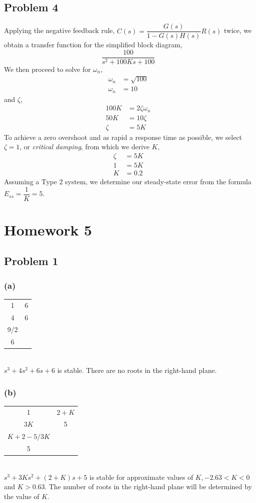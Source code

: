 \documentclass[letterpaper,10pt]{article}
\begin{document}
\subsection*{Problem 4}
Applying the negative feedback rule, $C(s) = \dfrac{G(s)}{1-G(s)H(s)}R(s)$ twice, we obtain a transfer function for the simplified block diagram, \[ \dfrac{100}{s^2 + 100Ks + 100}\]  We then proceed to solve for $\omega_{n}$,
\begin{align*}
	\omega_{n} &= \sqrt{100} \\
	\omega_{n} &= 10 
\end{align*}
and $\zeta$,
\begin{align*}
	100K &= 2\zeta\omega_{n} \\
	50K &= 10\zeta \\
	\zeta &= 5K
\end{align*}
To achieve a zero overshoot and as rapid a response time as possible, we select $\zeta = 1$, or \emph{critical damping}, from which we derive $K$,
\begin{align*}
	\zeta &= 5K \\
	1 &= 5K \\
	K &= 0.2 
\end{align*}
Assuming a Type 2 system, we determine our steady-state error from the formula  $E_{ss} = \dfrac{1}{K} = 5$.

\section*{Homework 5}
\subsection*{Problem 1}
\subsubsection*{(a)}
\begin{tabular}{cc}
	1&6\\
	4&6\\
	9/2&\\
	6&
\end{tabular}\\
$s^3+4s^2+6s+6$ is stable.  There are no roots in the right-hand plane.
\subsubsection*{(b)}
\begin{tabular}{cc}
	1&$2+K$\\
	$3K$&5\\
	$K+2-5/3K$&\\
	5&
\end{tabular}\\
$s^3+3Ks^2+(2+K)s+5$ is stable for approximate values of $K, -2.63 < K < 0$ and $K > 0.63$.  The number of roots in the right-hand plane will be determined by the value of $K$.
\end{document}
